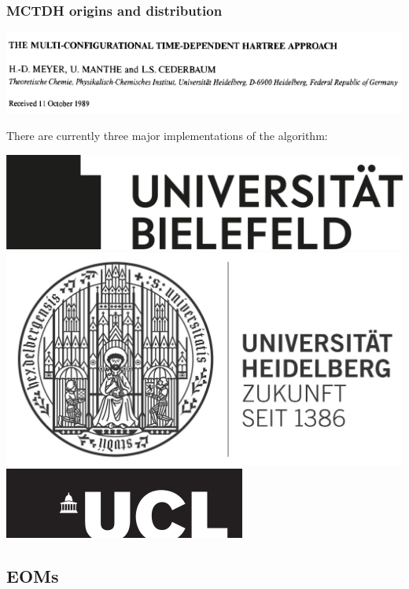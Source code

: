 \documentclass{beamer}
\begin{document}
\begin{frame} 
  \frametitle{MCTDH origins and distribution}
\begin{center}
  \includegraphics[scale=0.5, cfbox=blue 1pt]{first_mctdh.png}
\end{center}
There are currently three major implementations of the algorithm:
\begin{center}
  \includegraphics[scale=.07]{manthe.png}
  \hspace{.5cm}
  \includegraphics[scale=.07]{dieter.jpg}
  \hspace{.5cm}
\includegraphics[scale=.2]{graham.png}
\end{center}

  
\end{frame}

\subsection{EOMs}\label{eom}
\end{document}
